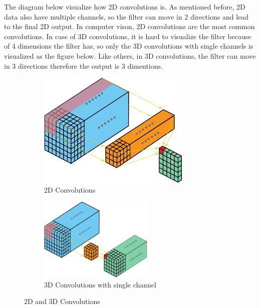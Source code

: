 \documentclass[a4paper, 12pt]{article}
\begin{document}
The diagram below visualize how 2D convolutions is. As mentioned before, 2D data also have multiple channels, so the filter can move in 2 directions and lead to the final 2D output. In computer vison, 2D convolutions are the most common convolutions. In case of 3D convolutions, it is hard to visualize the filter because of 4 dimensions the filter has, so only the 3D convolutions with single channels is visualized as the figure below. Like others, in 3D convolutions, the filter can move in 3 directions therefore the output is 3 dimentions.

\begin{figure}[H]
    \begin{subfigure}[b]{0.4\textwidth}
        \centering
        \includegraphics[width=0.8\textwidth]{2D Conv.png}
        \caption{2D Convolutions}
        \label{a}
    \end{subfigure}
    \hfill
    \begin{subfigure}[b]{0.6\textwidth}
        \centering
        \includegraphics[width=0.6\textwidth]{3D - single channel.png}
        \caption{3D Convolutions with single channel}
        \label{b}
    \end{subfigure}
    \hfill
    \caption{2D and 3D Convolutions}
    \label{Figure 2D 3D}
\end{figure}
\end{document}
